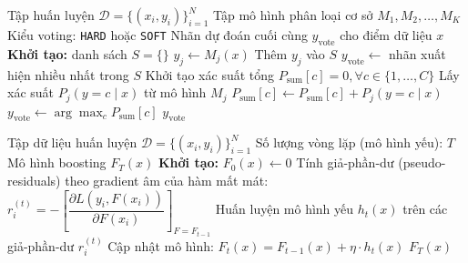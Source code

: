 \begin{algorithm}[htbp]
\caption{Voting: Kết hợp dự đoán từ nhiều mô hình phân loại}
\label{voting_ag1}
\begin{algorithmic}[1]
\Require Tập huấn luyện $\mathcal{D} = \{(x_i, y_i)\}_{i=1}^N$
\Statex \qquad Tập mô hình phân loại cơ sở $M_1, M_2, \dots, M_K$
\Statex \qquad Kiểu voting: \texttt{HARD} hoặc \texttt{SOFT}
\Ensure Nhãn dự đoán cuối cùng $y_{\text{vote}}$ cho điểm dữ liệu $x$
\State \textbf{Khởi tạo:} danh sách $S = \{\}$ 
        \State $y_j \gets M_j(x)$ 
        \State Thêm $y_j$ vào $S$
    \EndFor
    \State $y_{\text{vote}} \gets$ nhãn xuất hiện nhiều nhất trong $S$
    \State Khởi tạo xác suất tổng $P_{\text{sum}}[c] = 0, \forall c \in \{1, \dots, C\}$
        \State Lấy xác suất $P_j(y = c \mid x)$ từ mô hình $M_j$
            \State $P_{\text{sum}}[c] \gets P_{\text{sum}}[c] + P_j(y = c \mid x)$
        \EndFor
    \EndFor
    \State $y_{\text{vote}} \gets \arg\max_{c} P_{\text{sum}}[c]$
\EndIf
\State \Return $y_{\text{vote}}$
\end{algorithmic}
\end{algorithm}

\begin{algorithm}[htbp]
\caption{Boosting: Kết hợp tuần tự các mô hình học yếu}
\label{boosting_ag1}
\begin{algorithmic}[1]
\Require Tập dữ liệu huấn luyện $\mathcal{D} = \{(x_i, y_i)\}_{i=1}^N$
\Statex \qquad Số lượng vòng lặp (mô hình yếu): $T$
\Ensure Mô hình boosting $F_T(x)$
\State \textbf{Khởi tạo:} $F_0(x) \gets 0$ 
    \State Tính giả-phần-dư (pseudo-residuals) theo gradient âm của hàm mất mát: $r_i^{(t)} = -\left[\dfrac{\partial L(y_i, F(x_i))}{\partial F(x_i)}\right]_{F = F_{t-1}}$ 
    \State Huấn luyện mô hình yếu $h_t(x)$ trên các giả-phần-dư $r_i^{(t)}$
    \State Cập nhật mô hình: $F_t(x) = F_{t-1}(x) + \eta \cdot h_t(x)$
\EndFor
\State \Return $F_T(x)$
\end{algorithmic}
\end{algorithm}

